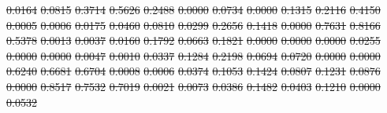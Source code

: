 \documentclass[11pt, a4paper]{book}
\providecommand{\DIFdeltex}[1]{{\protect\color{red}\sout{#1}}}                      %
\providecommand{\DIFdel}[1]{\texorpdfstring{\DIFdeltex{#1}}{}} %
\begin{document}
\DIFdel{0.0164 }%
\DIFdel{0.0815 }%
\DIFdel{0.3714 }%
\DIFdel{0.5626 }%
\DIFdel{0.2488 }%
\DIFdel{0.0000 }%
\DIFdel{0.0734 }%
\DIFdel{0.0000 }%
\DIFdel{0.1315 }%
\DIFdel{0.2116 }%
\DIFdel{0.4150 }%
\DIFdel{0.0005 }%
\DIFdel{0.0006 }%
\DIFdel{0.0175 }%
\DIFdel{0.0460 }%
\DIFdel{0.0810 }%
\DIFdel{0.0299 }%
\DIFdel{0.2656 }%
\DIFdel{0.1418 }%
\DIFdel{0.0000 }%
\DIFdel{0.7631 }%
\DIFdel{0.8166 }%
\DIFdel{0.5378 }%
\DIFdel{0.0013 }%
\DIFdel{0.0037 }%
\DIFdel{0.0160 }%
\DIFdel{0.1792 }%
\DIFdel{0.0663 }%
\DIFdel{0.1821 }%
\DIFdel{0.0000 }%
\DIFdel{0.0000 }%
\DIFdel{0.0000 }%
\DIFdel{0.0255 }%
\DIFdel{0.0000 }%
\DIFdel{0.0000 }%
\DIFdel{0.0047 }%
\DIFdel{0.0010 }%
\DIFdel{0.0337 }%
\DIFdel{0.1284 }%
\DIFdel{0.2198 }%
\DIFdel{0.0694 }%
\DIFdel{0.0720 }%
\DIFdel{0.0000 }%
\DIFdel{0.0000 }%
\DIFdel{0.6240 }%
\DIFdel{0.6681 }%
\DIFdel{0.6704 }%
\DIFdel{0.0008 }%
\DIFdel{0.0006 }%
\DIFdel{0.0374 }%
\DIFdel{0.1053 }%
\DIFdel{0.1424 }%
\DIFdel{0.0807 }%
\DIFdel{0.1231 }%
\DIFdel{0.0876 }%
\DIFdel{0.0000 }%
\DIFdel{0.8517 }%
\DIFdel{0.7532 }%
\DIFdel{0.7019 }%
\DIFdel{0.0021 }%
\DIFdel{0.0073 }%
\DIFdel{0.0386 }%
\DIFdel{0.1482 }%
\DIFdel{0.0403 }%
\DIFdel{0.1210 }%
\DIFdel{0.0000 }%
\DIFdel{0.0532 }%
\end{document}
